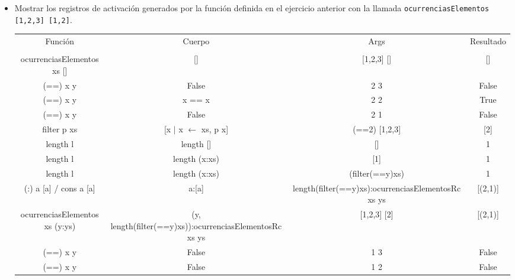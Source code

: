 \begin{enumerate}
{\begin{itemize}
{            (Le llamaremos \verb|ocurrenciasElementosRc|).
                \begin{lstlisting}[language=Haskell]
{- ocurrenciasElementosRC: Funcion RECURSIVA que toma como argumentos dos
    listas y devuelve una lista de parejas, en donde cada pareja contiene en su
    parte izquierda un elemento de la segunda lista y en su parte derecha el
    numero de veces que aparece dicho elemento en la primera lista. -}
ocurrenciasElementosRc :: forall a. (Eq a, Show a) => [a] -> [a] -> [(a,Int)]
ocurrenciasElementosRc xs [] = []
ocurrenciasElementosRc xs (y:ys) = (y, length (filter (== y) xs)) : ocurrenciasElementosRc xs ys\end{lstlisting}}
            \item { Mostrar los registros de activación generados por la función definida en el ejercicio anterior con la llamada \verb|ocurrenciasElementos [1,2,3] [1,2]|.
                \begin{center}
                \begin{NiceTabular}{|c c c c|}
                    Función & Cuerpo & Args & Resultado \\
                    &&&\\
                    ocurrenciasElementos xs [] & [] & [1,2,3] [] & [] \\ \hline
                    (==) x y & False & 2 3 & False \\ \hline
                    (==) x y & x == x & 2 2 & True \\ \hline
                    (==) x y & False & 2 1 & False \\ \hline
                    filter p xs & [x $|$ x $\leftarrow$ xs, p x] & (==2) [1,2,3] & [2] \\ \hline
                    length l & length [] & [] & 1 \\ \hline
                    length l & length (x:xs) & [1] & 1 \\ \hline
                    length l & length (x:xs) & (filter(==y)xs) & 1 \\ \hline
                    (:) a [a] / cons a [a] & a:[a] & length(filter(==y)xs):ocurrenciasElementosRc xs ys & [(2,1)] \\ \hline
                    ocurrenciasElementos xs (y:ys) & (y, length(filter(==y)xs)):ocurrenciasElementosRc xs ys & [1,2,3] [2] & [(2,1)] \\ \hline
                    (==) x y & False & 1 3 & False \\ \hline
                    (==) x y & False & 1 2 & False \\ \hline

\end{NiceTabular}
\end{center}}
\end{itemize}}
\end{enumerate}
